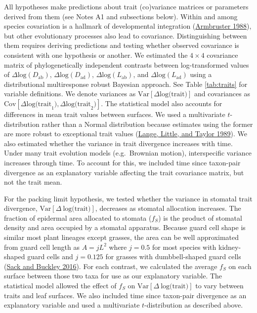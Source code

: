 \documentclass[
  12pt,
]{article}
\begin{document}
All hypotheses make predictions about trait (co)variance matrices or parameters derived from them (see Notes A1 and subsections below). Within and among species covariation is a hallmark of developmental integration (\protect\hyperlink{ref-armbruster_multilevel_1988}{Armbruster 1988}), but other evolutionary processes also lead to covariance. Distinguishing between them requires deriving predictions and testing whether observed covariance is consistent with one hypothesis or another. We estimated the \(4 \times 4\) covariance matrix of phylogenetically independent contrasts between log-transformed values of \(\Delta \text{log}(D_\mathrm{ab})\), \(\Delta \text{log}(D_\mathrm{ad})\), \(\Delta \text{log}(L_\mathrm{ab})\), and \(\Delta \text{log}(L_\mathrm{ad})\) using a distributional multiresponse robust Bayesian approach. See Table \ref{tab:traits} for variable definitions. We denote variances as \(\text{Var}[\Delta \text{log(trait)}]\) and covariances as \(\text{Cov}[\Delta \text{log(trait}_1),\Delta \text{log(trait}_2)]\). The statistical model also accounts for differences in mean trait values between surfaces. We used a multivariate \(t\)-distribution rather than a Normal distribution because estimates using the former are more robust to exceptional trait values (\protect\hyperlink{ref-lange_robust_1989}{Lange, Little, and Taylor 1989}). We also estimated whether the variance in trait divergence increases with time. Under many trait evolution models (e.g.~Brownian motion), interspecific variance increases through time. To account for this, we included time since taxon-pair divergence as an explanatory variable affecting the trait covariance matrix, but not the trait mean.

For the packing limit hypothesis, we tested whether the variance in stomatal trait divergence, \(\textrm{Var}[\Delta~\textrm{log(trait)}]\), decreases as stomatal allocation increases. The fraction of epidermal area allocated to stomata (\(f_S\)) is the product of stomatal density and area occupied by a stomatal apparatus. Because guard cell shape is similar most plant lineages except grasses, the area can be well approximated from guard cell length as \(A = j L ^ 2\) where \(j = 0.5\) for most species with kidney-shaped guard cells and \(j = 0.125\) for grasses with dumbbell-shaped guard cells (\protect\hyperlink{ref-sack_developmental_2016}{Sack and Buckley 2016}). For each contrast, we calculated the average \(f_S\) on each surface between those two taxa for use as our explanatory variable. The statistical model allowed the effect of \(f_S\) on \(\textrm{Var}[\Delta~\textrm{log(trait)}]\) to vary between traits and leaf surfaces. We also included time since taxon-pair divergence as an explanatory variable and used a multivariate \(t\)-distribution as described above.
\end{document}
